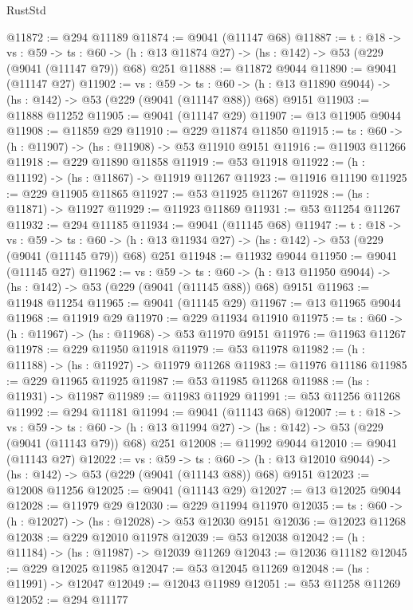 \begin{lexlean}{RustStd}
\begin{coremodule}
@11872 := @294 @11189
@11874 := @9041 (@11147 @68)
@11887 := {t : @18} ->
  {vs : @59} ->
  {ts : @60} -> (h : @13 @11874 @27) -> (hs : @142) -> @53 (@229 (@9041 (@11147 @79)) @68) @251
@11888 := @11872 @9044
@11890 := @9041 (@11147 @27)
@11902 := {vs : @59} ->
  {ts : @60} -> (h : @13 @11890 @9044) -> (hs : @142) -> @53 (@229 (@9041 (@11147 @88)) @68) @9151
@11903 := @11888 @11252
@11905 := @9041 (@11147 @29)
@11907 := @13 @11905 @9044
@11908 := @11859 @29
@11910 := @229 @11874 @11850
@11915 := {ts : @60} -> (h : @11907) -> (hs : @11908) -> @53 @11910 @9151
@11916 := @11903 @11266
@11918 := @229 @11890 @11858
@11919 := @53 @11918
@11922 := (h : @11192) -> (hs : @11867) -> @11919 @11267
@11923 := @11916 @11190
@11925 := @229 @11905 @11865
@11927 := @53 @11925 @11267
@11928 := (hs : @11871) -> @11927
@11929 := @11923 @11869
@11931 := @53 @11254 @11267
@11932 := @294 @11185
@11934 := @9041 (@11145 @68)
@11947 := {t : @18} ->
  {vs : @59} ->
  {ts : @60} -> (h : @13 @11934 @27) -> (hs : @142) -> @53 (@229 (@9041 (@11145 @79)) @68) @251
@11948 := @11932 @9044
@11950 := @9041 (@11145 @27)
@11962 := {vs : @59} ->
  {ts : @60} -> (h : @13 @11950 @9044) -> (hs : @142) -> @53 (@229 (@9041 (@11145 @88)) @68) @9151
@11963 := @11948 @11254
@11965 := @9041 (@11145 @29)
@11967 := @13 @11965 @9044
@11968 := @11919 @29
@11970 := @229 @11934 @11910
@11975 := {ts : @60} -> (h : @11967) -> (hs : @11968) -> @53 @11970 @9151
@11976 := @11963 @11267
@11978 := @229 @11950 @11918
@11979 := @53 @11978
@11982 := (h : @11188) -> (hs : @11927) -> @11979 @11268
@11983 := @11976 @11186
@11985 := @229 @11965 @11925
@11987 := @53 @11985 @11268
@11988 := (hs : @11931) -> @11987
@11989 := @11983 @11929
@11991 := @53 @11256 @11268
@11992 := @294 @11181
@11994 := @9041 (@11143 @68)
@12007 := {t : @18} ->
  {vs : @59} ->
  {ts : @60} -> (h : @13 @11994 @27) -> (hs : @142) -> @53 (@229 (@9041 (@11143 @79)) @68) @251
@12008 := @11992 @9044
@12010 := @9041 (@11143 @27)
@12022 := {vs : @59} ->
  {ts : @60} -> (h : @13 @12010 @9044) -> (hs : @142) -> @53 (@229 (@9041 (@11143 @88)) @68) @9151
@12023 := @12008 @11256
@12025 := @9041 (@11143 @29)
@12027 := @13 @12025 @9044
@12028 := @11979 @29
@12030 := @229 @11994 @11970
@12035 := {ts : @60} -> (h : @12027) -> (hs : @12028) -> @53 @12030 @9151
@12036 := @12023 @11268
@12038 := @229 @12010 @11978
@12039 := @53 @12038
@12042 := (h : @11184) -> (hs : @11987) -> @12039 @11269
@12043 := @12036 @11182
@12045 := @229 @12025 @11985
@12047 := @53 @12045 @11269
@12048 := (hs : @11991) -> @12047
@12049 := @12043 @11989
@12051 := @53 @11258 @11269
@12052 := @294 @11177

\end{coremodule}
\end{lexlean}
